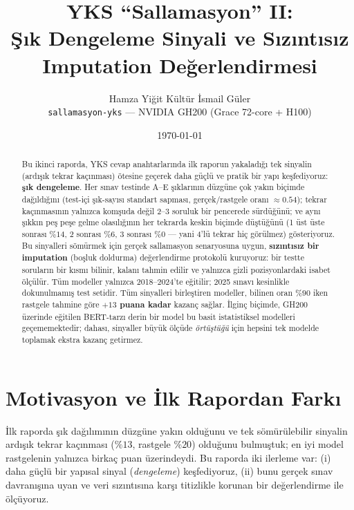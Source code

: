 \documentclass[11pt]{article}
\title{\textbf{YKS ``Sallamasyon'' II:\\
Şık Dengeleme Sinyali ve Sızıntısız Imputation Değerlendirmesi}}
\author{Hamza Yiğit Kültür \quad\textbullet\quad İsmail Güler\\[2pt]
\small \texttt{sallamasyon-yks} --- NVIDIA GH200 (Grace 72-core + H100)}
\date{\today}
\begin{document}
\maketitle

\begin{abstract}
\noindent
Bu ikinci raporda, YKS cevap anahtarlarında ilk raporun yakaladığı tek
sinyalin (ardışık tekrar kaçınması) ötesine geçerek daha güçlü ve pratik
bir yapı keşfediyoruz: \textbf{şık dengeleme}. Her sınav testinde A--E
şıklarının düzgüne çok yakın biçimde dağıldığını (test-içi şık-sayısı
standart sapması, gerçek/rastgele oranı $\approx 0.54$); tekrar kaçınmasının
yalnızca komşuda değil 2--3 soruluk bir pencerede sürdüğünü; ve aynı şıkkın
peş peşe gelme olasılığının her tekrarda keskin biçimde düştüğünü
(1 üst üste sonrası $\%14$, 2 sonrası $\%6$, 3 sonrası $\%0$ --- yani 4'lü
tekrar hiç görülmez) gösteriyoruz. Bu sinyalleri sömürmek için gerçek
sallamasyon senaryosuna uygun, \textbf{sızıntısız bir imputation} (boşluk
doldurma) değerlendirme protokolü kuruyoruz: bir testte soruların bir kısmı
bilinir, kalanı tahmin edilir ve yalnızca gizli pozisyonlardaki isabet
ölçülür. Tüm modeller yalnızca 2018--2024'te eğitilir; 2025 sınavı kesinlikle
dokunulmamış test setidir. Tüm sinyalleri birleştiren modeller, bilinen oran
$\%90$ iken rastgele tahmine göre \textbf{$+13$ puana kadar} kazanç sağlar.
İlginç biçimde, GH200 üzerinde eğitilen BERT-tarzı derin bir model bu basit
istatistiksel modelleri geçememektedir; dahası, sinyaller büyük ölçüde
\emph{örtüştüğü} için hepsini tek modelde toplamak ekstra kazanç getirmez.
\end{abstract}

\section{Motivasyon ve İlk Rapordan Farkı}
İlk raporda şık dağılımının düzgüne yakın olduğunu ve tek sömürülebilir
sinyalin ardışık tekrar kaçınması ($\%13$, rastgele $\%20$) olduğunu
bulmuştuk; en iyi model rastgelenin yalnızca birkaç puan üzerindeydi. Bu
raporda iki ilerleme var: (i) daha güçlü bir yapısal sinyal (\emph{dengeleme})
keşfediyoruz, (ii) bunu gerçek sınav davranışına uyan ve veri sızıntısına
karşı titizlikle korunan bir değerlendirme ile ölçüyoruz.
\end{document}
